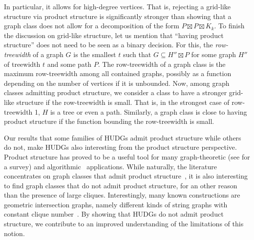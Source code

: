 \documentclass[a4paper,english,cleveref,thm-restate]{lipics-v2021}
\newcommand{\thomas}[1]{\todo[linecolor=blue!25,backgroundcolor=blue!25]{\footnotesize#1}}
\begin{document}
In particular, it allows for high-degree vertices.
That is, rejecting a grid-like structure via product structure is significantly stronger than showing that a graph class does not allow for a decomposition of the form $ P \boxtimes P \boxtimes K_k $.
%
To finish the discussion on grid-like structure, let us mention that \enquote{having product structure} does not need to be seen as a binary decision.
For this, the \emph{row-treewidth} of a graph $ G $ is the smallest $ t $ such that $ G \subseteq H'' \boxtimes P $ for some graph $ H'' $ of treewidth $ t $ and some path $ P $.
The row-treewidth of a graph class is the maximum row-treewidth among all contained graphs, possibly as a function depending on the number of vertices if it is unbounded.
Now, among graph classes admitting product structure, we consider a class to have a stronger grid-like structure if the row-treewidth is small.
That is, in the strongest case of row-treewidth 1, $ H $ is a tree or even a path.
Similarly, a graph class is close to having product structure if the function bounding the row-treewidth is small.

Our results that some families of HUDGs admit product structure while others do not, 
make HUDGs also interesting from the product structure perspective.
Product structure has proved to be a useful tool for many graph-theoretic (see \cite{hickingbotham_shallow_2024} for a survey) and algorithmic~\cite{an_PS_algo_application_2025,bose_optimal_2022} applications.
While naturally, the literature concentrates on graph classes that admit product structure~\cite{dujmovic_planar_2019,campbell_product_2022,hickingbotham_shallow_2024,hickingbotham_product_2024,distel_improved_2022,dujmovic_graph_2023}, it is also interesting to find graph classes that do not admit product structure, for an other reason than the presence of large cliques.
Interestingly, many known constructions are geometric intersection graphs, namely different kinds of string graphs with constant clique number~\cite{merker_intersection_2024,karol_string_product_structure_2025}.
By showing that HUDGs do not admit product structure, we contribute to an improved understanding of the limitations of this notion.
\end{document}
